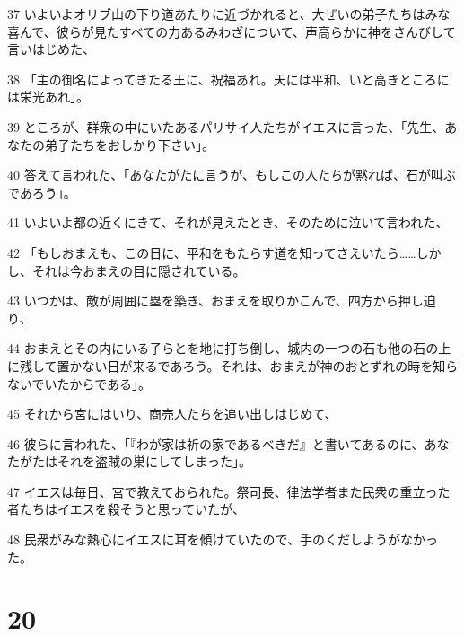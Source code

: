 \par 37 いよいよオリブ山の下り道あたりに近づかれると、大ぜいの弟子たちはみな喜んで、彼らが見たすべての力あるみわざについて、声高らかに神をさんびして言いはじめた、
\par 38 「主の御名によってきたる王に、祝福あれ。天には平和、いと高きところには栄光あれ」。
\par 39 ところが、群衆の中にいたあるパリサイ人たちがイエスに言った、「先生、あなたの弟子たちをおしかり下さい」。
\par 40 答えて言われた、「あなたがたに言うが、もしこの人たちが黙れば、石が叫ぶであろう」。
\par 41 いよいよ都の近くにきて、それが見えたとき、そのために泣いて言われた、
\par 42 「もしおまえも、この日に、平和をもたらす道を知ってさえいたら……しかし、それは今おまえの目に隠されている。
\par 43 いつかは、敵が周囲に塁を築き、おまえを取りかこんで、四方から押し迫り、
\par 44 おまえとその内にいる子らとを地に打ち倒し、城内の一つの石も他の石の上に残して置かない日が来るであろう。それは、おまえが神のおとずれの時を知らないでいたからである」。
\par 45 それから宮にはいり、商売人たちを追い出しはじめて、
\par 46 彼らに言われた、「『わが家は祈の家であるべきだ』と書いてあるのに、あなたがたはそれを盗賊の巣にしてしまった」。
\par 47 イエスは毎日、宮で教えておられた。祭司長、律法学者また民衆の重立った者たちはイエスを殺そうと思っていたが、
\par 48 民衆がみな熱心にイエスに耳を傾けていたので、手のくだしようがなかった。

\chapter{20}

